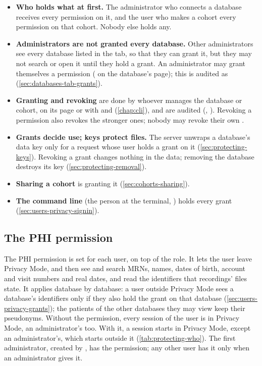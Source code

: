 \begin{itemize}
\item \textbf{Who holds what at first.} The administrator who connects a database receives every
  permission on it, and the user who makes a cohort every permission on that cohort. Nobody else
  holds any.
\item \textbf{Administrators are not granted every database.} Other administrators see every
  database listed in the  tab, so that they can grant it, but they may not search
  or open it until they hold a grant. An administrator may grant themselves a permission
  ( on the database's page); this is audited as 
  (\cref{sec:databases-tab-grants}).
\item \textbf{Granting and revoking} are done by whoever manages the database or cohort, on its
  page or with  and 
  (\cref{chap:cli}), and are audited (, ). Revoking a permission also
  revokes the stronger ones; nobody may revoke their own .
\item \textbf{Grants decide use; keys protect files.} The server unwraps a database's data key
  only for a request whose user holds a grant on it (\cref{sec:protecting-keys}). Revoking a
  grant changes nothing in the data; removing the database destroys its key
  (\cref{sec:protecting-removal}).
\item \textbf{Sharing a cohort} is granting it (\cref{sec:cohorts-sharing}).
\item \textbf{The command line} (the person at the terminal, ) holds every
  grant (\cref{sec:users-privacy-signin}).
\end{itemize}

\subsection{The PHI permission}
\label{sec:users-privacy-phi}

The PHI permission is set for each user, on top of the role. It lets the user leave Privacy Mode,
and then see and search MRNs, names, dates of birth, account and visit numbers and real dates,
and read the identifiers that recordings' files state. It applies database by database: a user
outside Privacy Mode sees a database's identifiers only if they also hold the  grant on
that database (\cref{sec:users-privacy-grants}); the patients of the other databases they may
view keep their pseudonyms. Without the permission, every session of the user is in Privacy Mode,
an administrator's too. With it, a session starts in Privacy Mode, except
an administrator's, which starts outside it (\cref{tab:protecting-who}). The first administrator,
created by , has the permission; any other user has it only when an
administrator gives it.

